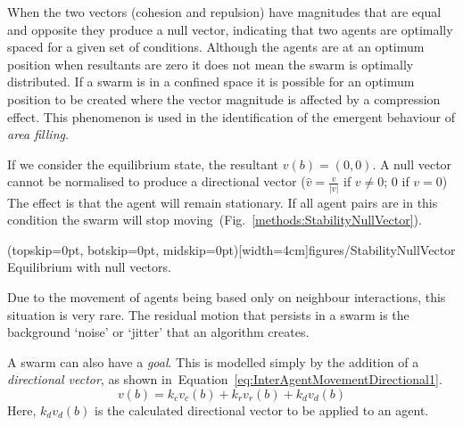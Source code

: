 \documentclass{ieeeaccess}
\begin{document}

When the two vectors (cohesion and repulsion) have magnitudes that are equal
and opposite they produce a null vector, indicating that two agents are
optimally spaced for a given set of conditions. Although the agents are at an
optimum position when resultants are zero it does not mean the swarm is
optimally distributed. If a swarm is in a confined space it is possible for an
optimum position to be created where the vector magnitude is affected by a
compression effect. This phenomenon is used in the identification of the
emergent behaviour of \textit{area filling}.  

If we consider the equilibrium state, %
the resultant $v(b)=(0,0)$. A null vector cannot be normalised to produce a
directional vector ($\hat{v} = \frac{v}{|v|}$ if $v\neq0$; $0$ if $v=0$) The
effect is that the agent will remain stationary. If all agent pairs are in this
condition the swarm will stop moving~(Fig.~\ref{methods:StabilityNullVector}).

\Figure[t!](topskip=0pt, botskip=0pt, midskip=0pt)[width=4cm]{figures/StabilityNullVector}
{Equilibrium with null vectors.\label{methods:StabilityNullVector}}


Due to the movement of agents being based only on neighbour interactions, this
situation is very rare. The residual motion that persists in a swarm is the
background `noise' or `jitter' that an algorithm creates.

A swarm can also have a \textit{goal}. This is modelled simply by the addition of 
a \textit{directional vector}, as shown in~Equation~\ref{eq:InterAgentMovementDirectional1}.
\begin{equation}\label{eq:InterAgentMovementDirectional1}
v(b) = k_cv_{c}(b) + k_rv_{r}(b) + k_dv_{d}(b)
\end{equation}
Here, $k_dv_{d}(b)$ is the
calculated directional vector to be applied to an agent.
\end{document}
